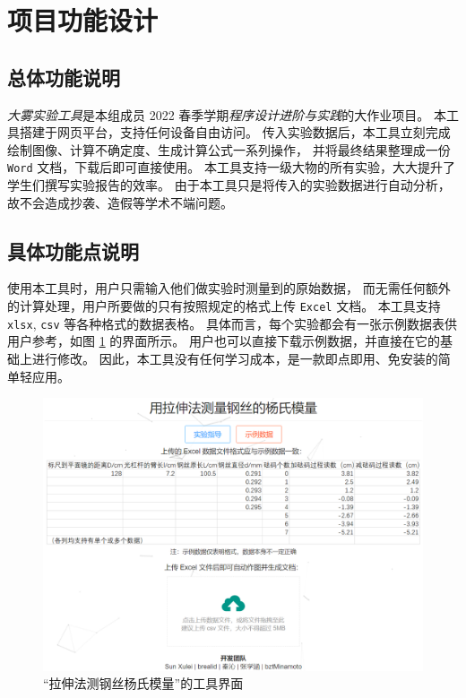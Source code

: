\section{项目功能设计}

\subsection{总体功能说明}

\emph{大雾实验工具}是本组成员 2022 春季学期\textit{程序设计进阶与实践}的大作业项目。
本工具搭建于网页平台，支持任何设备自由访问。
传入实验数据后，本工具立刻完成绘制图像、计算不确定度、生成计算公式一系列操作，
并将最终结果整理成一份 \verb|Word| 文档，下载后即可直接使用。
本工具支持一级大物的所有实验，大大提升了学生们撰写实验报告的效率。
由于本工具只是将传入的实验数据进行自动分析，故不会造成抄袭、造假等学术不端问题。

\subsection{具体功能点说明}

使用本工具时，用户只需输入他们做实验时测量到的原始数据，
而无需任何额外的计算处理，用户所要做的只有按照规定的格式上传 \verb|Excel| 文档。
本工具支持 \verb|xlsx|, \verb|csv| 等各种格式的数据表格。
具体而言，每个实验都会有一张示例数据表供用户参考，如图 \ref{fig:interface} 的界面所示。
用户也可以直接下载示例数据，并直接在它的基础上进行修改。
因此，本工具没有任何学习成本，是一款即点即用、免安装的简单轻应用。

\begin{figure}[htbp]
  \centering
  \includegraphics[width=\columnwidth]{figure/interface.png}
  \caption{“拉伸法测钢丝杨氏模量”的工具界面}
  \label{fig:interface}
\end{figure}

